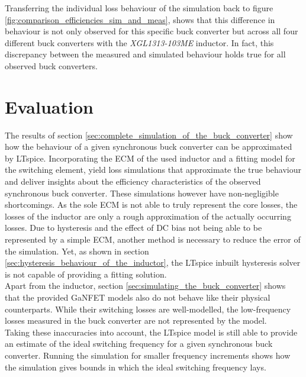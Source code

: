Transferring the individual loss behaviour of the simulation back to figure \ref{fig:comparison_efficiencies_sim_and_meas}, shows that this difference in behaviour is not only observed for this specific buck converter but across all four different buck converters with the \textit{XGL1313-103ME} inductor. In fact, this discrepancy between the measured and simulated behaviour holds true for all observed buck converters.

 
\section{Evaluation}\label{sec:evaluation}
The results of section \ref{sec:complete_simulation_of_the_buck_converter} show how the behaviour of a given synchronous buck converter can be approximated by LTspice. Incorporating the \ac{ECM} of the used inductor and a fitting model for the switching element, yield loss simulations that approximate the true behaviour and deliver insights about the efficiency characteristics of the observed synchronous buck converter. These simulations however have non-negligible shortcomings. As the sole \ac{ECM} is not able to truly represent the core losses, the losses of the inductor are only a rough approximation of the actually occurring losses. Due to hysteresis and the effect of \ac{DC} bias not being able to be represented by a simple \ac{ECM}, another method is necessary to reduce the error of the simulation. Yet, as shown in section \ref{sec:hysteresis_behaviour_of_the_inductor}, the LTspice inbuilt hysteresis solver is not capable of providing a fitting solution.\\
Apart from the inductor, section \ref{sec:simulating_the_buck_converter} shows that the provided \ac{GaNFET} models also do not behave like their physical counterparts. While their switching losses are well-modelled, the low-frequency losses measured in the buck converter are not represented by the model.\\
Taking these inaccuracies into account, the LTspice model is still able to provide an estimate of the ideal switching frequency for a given synchronous buck converter. Running the simulation for smaller frequency increments shows how the simulation gives bounds in which the ideal switching frequency lays. 
